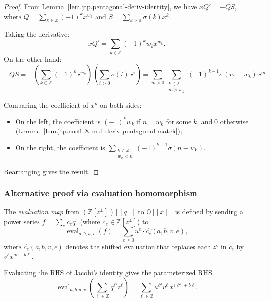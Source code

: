 \begin{proof}
From Lemma~\ref{lem.jtp.pentagonal-deriv-identity}, we have
$xQ'=-QS$, where $Q=\sum_{k\in\mathbb{Z}}(-1)^{k}x^{w_{k}}$
and $S=\sum_{k>0}\sigma(k)x^{k}$.

Taking the derivative:
\[
xQ' = \sum_{k\in\mathbb{Z}}(-1)^{k}w_{k}x^{w_{k}}.
\]
On the other hand:
\[
-QS = -\left(\sum_{k\in\mathbb{Z}}(-1)^{k}x^{w_{k}}\right)
\left(\sum_{i>0}\sigma(i)x^{i}\right)
= \sum_{m>0}\sum_{\substack{k\in\mathbb{Z};\\m>w_{k}}}
(-1)^{k-1}\sigma(m-w_{k})x^{m}.
\]

Comparing the coefficient of $x^{n}$ on both sides:
\begin{itemize}
\item On the left, the coefficient is $(-1)^{k}w_{k}$ if $n=w_{k}$
for some $k$, and $0$ otherwise (Lemma~\ref{lem.jtp.coeff-X-mul-deriv-pentagonal-match});
\item On the right, the coefficient is
$\sum_{\substack{k\in\mathbb{Z};\\w_{k}<n}}(-1)^{k-1}\sigma(n-w_{k})$.
\end{itemize}
Rearranging gives the result.
\end{proof}

\subsubsection{Alternative proof via evaluation homomorphism}

\begin{definition}
\label{def.jtp.evalJacobiCorrect}
\leanhelper
\leanok
The \emph{evaluation map} from $(\mathbb{Z}[z^{\pm}])[[q]]$ to $\mathbb{Q}[[x]]$
is defined by sending a power series $f = \sum_e c_e q^e$ (where $c_e \in \mathbb{Z}[z^{\pm}]$)
to
\[
\operatorname{eval}_{a,b,u,v}(f) = \sum_{e\geq 0} u^e \cdot \widehat{c_e}(a,b,v,e),
\]
where $\widehat{c_e}(a,b,v,e)$ denotes the shifted evaluation that replaces each
$z^\ell$ in $c_e$ by $v^\ell x^{ae+b\ell}$.
\end{definition}

\begin{lemma}
\label{lem.jtp.evalJacobiCorrect-jacobiRHS}
\leanhelper
\leanok
Evaluating the RHS of Jacobi's identity gives the parameterized RHS:
\[
\operatorname{eval}_{a,b,u,v}\!\left(\sum_{\ell\in\mathbb{Z}}q^{\ell^2}z^\ell\right)
= \sum_{\ell\in\mathbb{Z}} u^{\ell^2} v^\ell\, x^{a\ell^2+b\ell}.
\]
\end{lemma}

